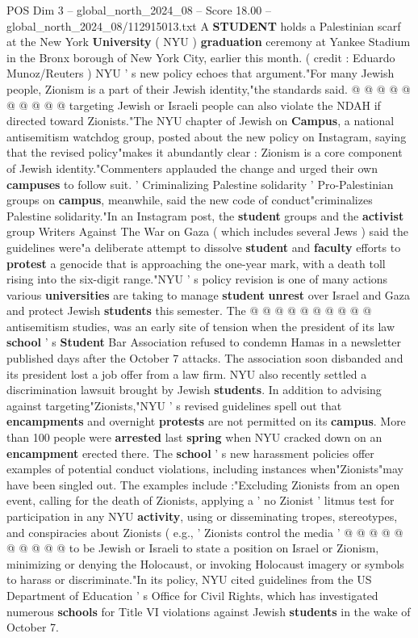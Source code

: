 \begin{textsample}{POS Dim 3 – global\_north\_2024\_08 – Score 18.00 – global\_north\_2024\_08/112915013.txt}
A \textbf{STUDENT} holds a Palestinian scarf at the New York \textbf{University} ( NYU ) \textbf{graduation} ceremony at Yankee Stadium in the Bronx borough of New York City, earlier this month. ( credit : Eduardo Munoz/Reuters ) NYU ' s new policy echoes that argument."For many Jewish people, Zionism is a part of their Jewish identity,"the standards said. @ @ @ @ @ @ @ @ @ @ targeting Jewish or Israeli people can also violate the NDAH if directed toward Zionists."The NYU chapter of Jewish on \textbf{Campus}, a national antisemitism watchdog group, posted about the new policy on Instagram, saying that the revised policy"makes it abundantly clear : Zionism is a core component of Jewish identity."Commenters applauded the change and urged their own \textbf{campuses} to follow suit. ' Criminalizing Palestine solidarity ' Pro-Palestinian groups on \textbf{campus}, meanwhile, said the new code of conduct"criminalizes Palestine solidarity."In an Instagram post, the \textbf{student} groups and the \textbf{activist} group Writers Against The War on Gaza ( which includes several Jews ) said the guidelines were"a deliberate attempt to dissolve \textbf{student} and \textbf{faculty} efforts to \textbf{protest} a genocide that is approaching the one-year mark, with a death toll rising into the six-digit range."NYU ' s policy revision is one of many actions various \textbf{universities} are taking to manage \textbf{student} \textbf{unrest} over Israel and Gaza and protect Jewish \textbf{students} this semester.
The @ @ @ @ @ @ @ @ @ @ antisemitism studies, was an early site of tension when the president of its law \textbf{school} ' s \textbf{Student} Bar Association refused to condemn Hamas in a newsletter published days after the October 7 attacks.
The association soon disbanded and its president lost a job offer from a law firm.
NYU also recently settled a discrimination lawsuit brought by Jewish \textbf{students}.
In addition to advising against targeting"Zionists,"NYU ' s revised guidelines spell out that \textbf{encampments} and overnight \textbf{protests} are not permitted on its \textbf{campus}.
More than 100 people were \textbf{arrested} last \textbf{spring} when NYU cracked down on an \textbf{encampment} erected there.
The \textbf{school} ' s new harassment policies offer examples of potential conduct violations, including instances when"Zionists"may have been singled out.
The examples include :"Excluding Zionists from an open event, calling for the death of Zionists, applying a ' no Zionist ' litmus test for participation in any NYU \textbf{activity}, using or disseminating tropes, stereotypes, and conspiracies about Zionists ( e.g., ' Zionists control the media ' @ @ @ @ @ @ @ @ @ @ to be Jewish or Israeli to state a position on Israel or Zionism, minimizing or denying the Holocaust, or invoking Holocaust imagery or symbols to harass or discriminate."In its policy, NYU cited guidelines from the US Department of Education ' s Office for Civil Rights, which has investigated numerous \textbf{schools} for Title VI violations against Jewish \textbf{students} in the wake of October 7.

\end{textsample}
